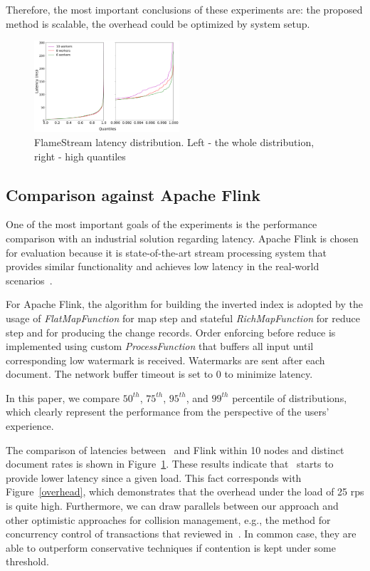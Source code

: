 Therefore, the most important conclusions of these experiments are: the proposed method is scalable, the overhead could be optimized by system setup.

\begin{figure}[htbp]
  \centering
  \includegraphics[width=0.48\textwidth]{pics/fs-index-quantiles}
  \caption{FlameStream latency distribution. Left - the whole distribution, right - high quantiles}
  \label {fs-index-quantiles}
\end{figure}

\subsection{Comparison against Apache Flink}

One of the most important goals of the experiments is the performance comparison with an industrial solution regarding latency. Apache Flink is chosen for evaluation because it is state-of-the-art stream processing system that provides similar functionality and achieves low latency in the real-world scenarios~\cite{S7530084}. 

For Apache Flink, the algorithm for building the inverted index is adopted by the usage of {\it FlatMapFunction} for map step and stateful {\it RichMapFunction} for reduce step and for producing the change records. Order enforcing before reduce is implemented using custom {\it ProcessFunction} that buffers all input until corresponding low watermark is received. Watermarks are sent after each document. The network buffer timeout is set to 0 to minimize latency.

In this paper, we compare $50^{th}$, $75^{th}$, $95^{th}$, and $99^{th}$ percentile of distributions, which clearly represent the performance from the perspective of the users' experience.

The comparison of latencies between \FlameStream\ and Flink within 10 nodes and distinct document rates is shown in Figure~\ref{fs-index-quantiles}. These results indicate that \FlameStream\ starts to provide lower latency since a given load. This fact corresponds with Figure~\ref{overhead}, which demonstrates that the overhead under the load of 25 rps is quite high. Furthermore, we can draw parallels between our approach and other optimistic approaches for collision management, e.g., the method for concurrency control of transactions that reviewed in~\cite{Cahill:2009:SIS:1620585.1620587}. In common case, they are able to outperform conservative techniques if contention is kept under some threshold.

